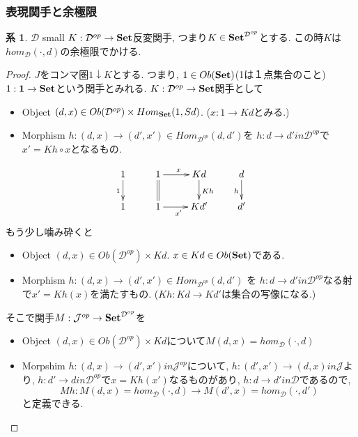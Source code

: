 \documentclass[dvipdfmx,a4paper,11pt]{report}
\theoremstyle{definition}
\newtheorem{cor}[thm]{系}
\begin{document}
\subsubsection{表現関手と余極限}

 \begin{tcolorbox}
 [colback = white, colframe = green!35!black, fonttitle = \bfseries,breakable = true]
\begin{cor}\cite[3.7節]{Mac}
\label{cor-colim-represent}
$\mathcal{D}$ small 
$K : \mathcal{D}^{op} \to {\bf Set}$反変関手, つまり$K \in {\bf Set}^{\mathcal{D}^{op}}$とする.
この時$K$は$hom_{\mathcal{D}}(\cdot, d)$の余極限でかける. 
\end{cor}
\end{tcolorbox}

\begin{proof}
$J$をコンマ圏$1 \downarrow K$とする.
つまり,
$1 \in Ob({\bf Set})$(1は１点集合のこと)
$1 :  {\bf 1} \to {\bf Set}$という関手とみれる. 
$K : \mathcal{D}^{op} \to {\bf Set}$関手として
\begin{itemize}
\item Object $(d,x) \in Ob(\mathcal{D}^{op}) \times Hom_{{\bf Set}}(1, Sd)$. ($x : 1 \to Kd$とみる.) 
\item Morphism $h : (d,x)  \to (d',x') \in Hom_{\mathcal{D}^{op}}(d,d') $を 
$h: d \to d' in \mathcal{D}^{op}$で$x'  = Kh \circ x$となるもの.
\end{itemize}

\begin{equation*}
\xymatrix@C=25pt@R=20pt{
1 \ar@{->}[d] _{1}&1\ar@{=}[d] \ar@{->}[r]^{x} & Kd\ar@{->}[d]^{Kh} &d\ar@{->}[d]_{h}\\
1&1\ar@{->}[r]_{x'} &Kd'&d' \\   
}
\end{equation*}
もう少し噛み砕くと
\begin{itemize}
\item Object $(d,x) \in Ob(\mathcal{D}^{op}) \times Kd$. $x \in Kd \in Ob({\bf Set})$である.
\item Morphism $h : (d,x)  \to (d',x') \in Hom_{\mathcal{D}^{op}}(d,d')$ を
$h: d \to d' in \mathcal{D}^{op}$なる射で$x' = Kh(x)$を満たすもの. ($Kh : Kd \to Kd'$は集合の写像になる.)
\end{itemize}

そこで関手$M : \mathcal{J}^{op} \to {\bf Set }^{\mathcal{D}^{op}}$を
\begin{itemize}
\item Object $(d,x) \in Ob(\mathcal{D}^{op}) \times Kd$について$M(d,x) = hom_{\mathcal{D}}(\cdot, d)$
\item Morpshim $h : (d,x)  \to (d',x') in \mathcal{J}^{op} $について, 
$h : (d',x') \to (d,x) in \mathcal{J}$より, 
$h : d'  \to d in \mathcal{D}^{op}$で$x = Kh(x')$なるものがあり, 
$h : d \to d' in \mathcal{D} $であるので, 
$$Mh :  M(d,x) = hom_{\mathcal{D}}( \cdot, d) \to  M(d',x) = hom_{\mathcal{D}}(\cdot, d') $$と定義できる. 
\end{itemize}


\end{proof}
\end{document}
